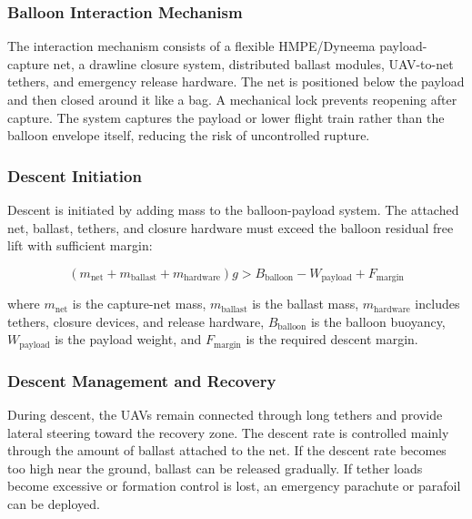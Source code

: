 \subsubsection{Balloon Interaction Mechanism}

The interaction mechanism consists of a flexible HMPE/Dyneema payload-capture net, a drawline closure system, distributed ballast modules, UAV-to-net tethers, and emergency release hardware. The net is positioned below the payload and then closed around it like a bag. A mechanical lock prevents reopening after capture. The system captures the payload or lower flight train rather than the balloon envelope itself, reducing the risk of uncontrolled rupture.

\subsubsection{Descent Initiation}

Descent is initiated by adding mass to the balloon-payload system. The attached net, ballast, tethers, and closure hardware must exceed the balloon residual free lift with sufficient margin:

\begin{equation}
    \left(m_{\mathrm{net}} + m_{\mathrm{ballast}} + m_{\mathrm{hardware}}\right)g 
    >
    B_{\mathrm{balloon}} - W_{\mathrm{payload}} + F_{\mathrm{margin}}
    \label{eq:ballast_descent_condition}
\end{equation}

where \(m_{\mathrm{net}}\) is the capture-net mass, \(m_{\mathrm{ballast}}\) is the ballast mass, \(m_{\mathrm{hardware}}\) includes tethers, closure devices, and release hardware, \(B_{\mathrm{balloon}}\) is the balloon buoyancy, \(W_{\mathrm{payload}}\) is the payload weight, and \(F_{\mathrm{margin}}\) is the required descent margin.

\subsubsection{Descent Management and Recovery}

During descent, the UAVs remain connected through long tethers and provide lateral steering toward the recovery zone. The descent rate is controlled mainly through the amount of ballast attached to the net. If the descent rate becomes too high near the ground, ballast can be released gradually. If tether loads become excessive or formation control is lost, an emergency parachute or parafoil can be deployed.

